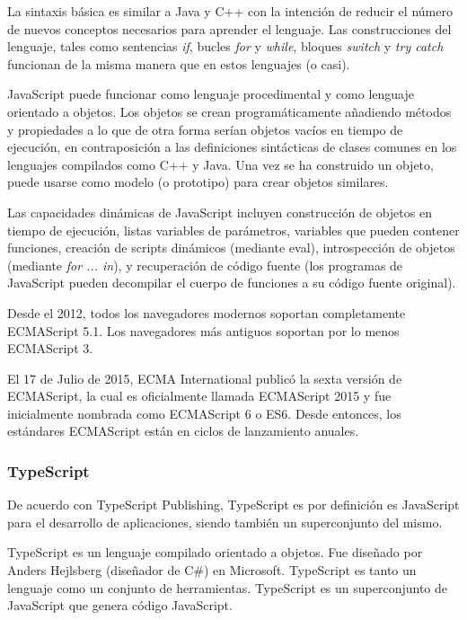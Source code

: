 La sintaxis básica es similar a Java y C++ con la intención de reducir el número de nuevos conceptos necesarios para aprender el lenguaje. Las construcciones del lenguaje, tales como sentencias \textit{if}, bucles \textit{for} y \textit{while}, bloques \textit{switch} y \textit{try catch} funcionan de la misma manera que en estos lenguajes (o casi).


JavaScript puede funcionar como lenguaje procedimental y como lenguaje orientado a objetos. Los objetos se crean programáticamente añadiendo métodos y propiedades a lo que de otra forma serían objetos vacíos en tiempo de ejecución, en contraposición a las definiciones sintácticas de clases comunes en los lenguajes compilados como C++ y Java. Una vez se ha construido un objeto, puede usarse como modelo (o prototipo) para crear objetos similares.


Las capacidades dinámicas de JavaScript incluyen construcción de objetos en tiempo de ejecución, listas variables de parámetros, variables que pueden contener funciones, creación de scripts dinámicos (mediante eval), introspección de objetos (mediante \textit{for ... in}), y recuperación de código fuente (los programas de JavaScript pueden decompilar el cuerpo de funciones a su código fuente original).


Desde el 2012, todos los navegadores modernos soportan completamente ECMAScript 5.1. Los navegadores más antiguos soportan por lo menos ECMAScript 3. 


El 17 de Julio de 2015, ECMA International publicó la sexta versión de ECMAScript, la cual es oficialmente llamada ECMAScript 2015 y fue inicialmente nombrada como ECMAScript 6 o ES6. Desde entonces, los estándares ECMAScript están en ciclos de lanzamiento anuales.


\subsubsection*{TypeScript}
De acuerdo con TypeScript Publishing\cite{typescript_publishing_typescript_2019}, TypeScript es por definición es JavaScript para el desarrollo de aplicaciones, siendo también un superconjunto del mismo.


TypeScript es un lenguaje compilado orientado a objetos. Fue diseñado por Anders Hejlsberg (diseñador de C\#) en Microsoft. TypeScript es tanto un lenguaje como un conjunto de herramientas. TypeScript es un superconjunto de JavaScript que genera código JavaScript.



